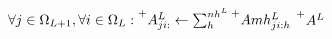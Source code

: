 {\begin{algorithm}[h]
\begin{algorithmic}[1]
    \State {}
    \State $\forall j \in \Omega_{L+1}, \forall i \in \Omega_L: \prescript{+}{}{A^{L}_{ji:}} \gets \sum_h^{nh^L} \prescript{+}{}{Amh^{L}_{ji:h}}$  \label{op:method3_max_alternative_pointwise_relu_this_op_may_be_different}
    \State \Return $\prescript{+}{}{A^{L}}$ 
    \EndProcedure

  \end{algorithmic}
  \end{algorithm}
}



